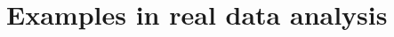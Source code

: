 \documentclass[fleqn,11pt]{article}
\begin{document}
\section{Examples in real data analysis}\label{section:sec6}
%
%
%
%
\end{document}
